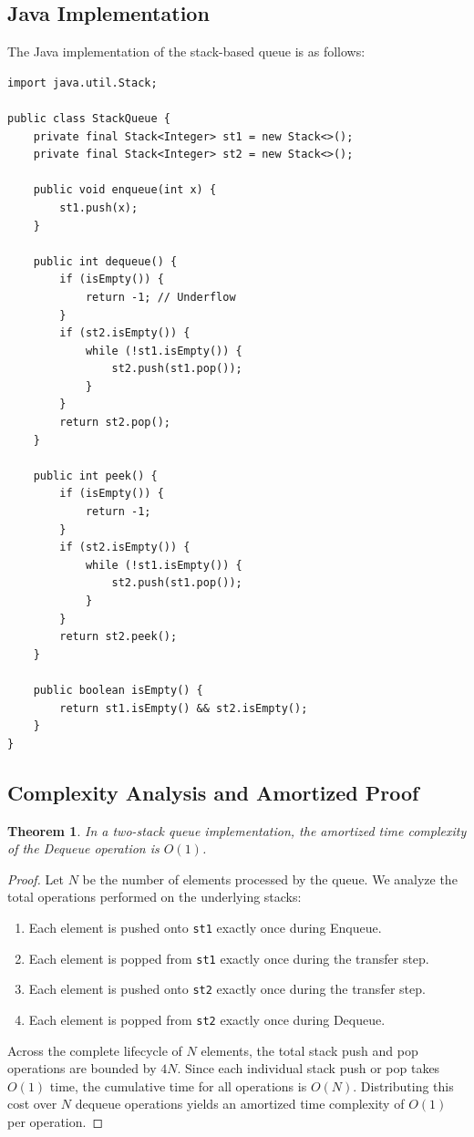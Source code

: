 \documentclass[10pt,journal,compsoc,onecolumn]{IEEEtran}
\newtheorem{theorem}{Theorem}
\begin{document}
\subsection{Java Implementation}
The Java implementation of the stack-based queue is as follows:
\begin{verbatim}
import java.util.Stack;

public class StackQueue {
    private final Stack<Integer> st1 = new Stack<>();
    private final Stack<Integer> st2 = new Stack<>();

    public void enqueue(int x) {
        st1.push(x);
    }

    public int dequeue() {
        if (isEmpty()) {
            return -1; // Underflow
        }
        if (st2.isEmpty()) {
            while (!st1.isEmpty()) {
                st2.push(st1.pop());
            }
        }
        return st2.pop();
    }

    public int peek() {
        if (isEmpty()) {
            return -1;
        }
        if (st2.isEmpty()) {
            while (!st1.isEmpty()) {
                st2.push(st1.pop());
            }
        }
        return st2.peek();
    }

    public boolean isEmpty() {
        return st1.isEmpty() && st2.isEmpty();
    }
}
\end{verbatim}

\subsection{Complexity Analysis and Amortized Proof}
\begin{theorem}
In a two-stack queue implementation, the amortized time complexity of the Dequeue operation is $O(1)$.
\end{theorem}
\begin{proof}
Let $N$ be the number of elements processed by the queue. We analyze the total operations performed on the underlying stacks:
\begin{enumerate}
    \item Each element is pushed onto \texttt{st1} exactly once during Enqueue.
    \item Each element is popped from \texttt{st1} exactly once during the transfer step.
    \item Each element is pushed onto \texttt{st2} exactly once during the transfer step.
    \item Each element is popped from \texttt{st2} exactly once during Dequeue.
\end{enumerate}
Across the complete lifecycle of $N$ elements, the total stack push and pop operations are bounded by $4N$. Since each individual stack push or pop takes $O(1)$ time, the cumulative time for all operations is $O(N)$. Distributing this cost over $N$ dequeue operations yields an amortized time complexity of $O(1)$ per operation.
\end{proof}
\end{document}
